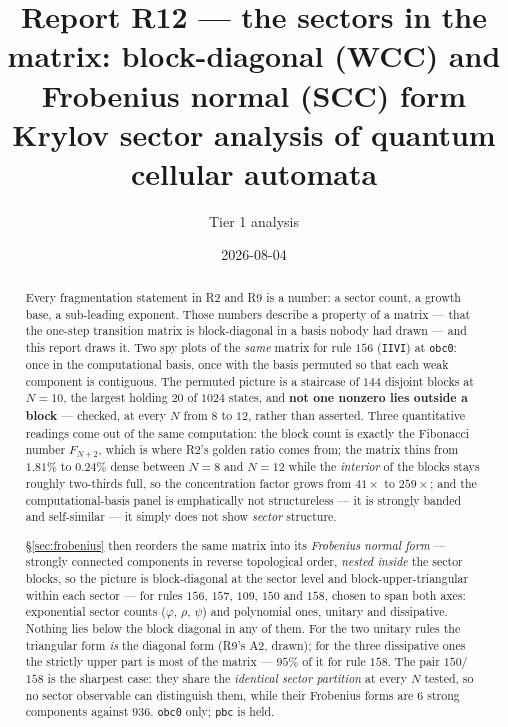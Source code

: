 \documentclass[11pt]{article}
\title{\textbf{Report R12 --- the sectors in the matrix: block-diagonal (WCC)
and Frobenius normal (SCC) form}\\
\large Krylov sector analysis of quantum cellular automata}
\author{Tier 1 analysis}
\date{2026-08-04}
\newcommand{\rt}[1]{\texttt{#1}}
\theoremstyle{plain}
\theoremstyle{definition}
\begin{document}
\maketitle

\begin{abstract}
Every fragmentation statement in R2 and R9 is a number: a sector count, a growth
base, a sub-leading exponent. Those numbers describe a property of a matrix ---
that the one-step transition matrix is block-diagonal in a basis nobody had drawn
--- and this report draws it. Two spy plots of the \emph{same} matrix for rule
$156$ (\rt{IIVI}) at \rt{obc0}: once in the computational basis, once with the
basis permuted so that each weak component is contiguous. The permuted picture is
a staircase of $144$ disjoint blocks at $N=10$, the largest holding $20$ of
$1024$ states, and \textbf{not one nonzero lies outside a block} --- checked, at
every $N$ from $8$ to $12$, rather than asserted. Three quantitative readings
come out of the same computation: the block count is exactly the Fibonacci number
$F_{N+2}$, which is where R2's golden ratio comes from; the matrix thins from
$1.81\%$ to $0.24\%$ dense between $N=8$ and $N=12$ while the \emph{interior} of
the blocks stays roughly two-thirds full, so the concentration factor grows from
$41\times$ to $259\times$; and the computational-basis panel is emphatically not
structureless --- it is strongly banded and self-similar --- it simply does not
show \emph{sector} structure.

\S\ref{sec:frobenius} then reorders the same matrix into its \emph{Frobenius
normal form} --- strongly connected components in reverse topological order,
\emph{nested inside} the sector blocks, so the picture is block-diagonal at the
sector level and block-upper-triangular within each sector --- for rules $156$,
$157$, $109$, $150$ and $158$, chosen to span both axes:
exponential sector counts ($\varphi$, $\rho$, $\psi$) and polynomial ones,
unitary and dissipative. Nothing lies below the block diagonal in any of them.
For the two unitary rules the triangular form \emph{is} the diagonal form
(R9's A2, drawn); for the three dissipative ones the strictly upper part is most
of the matrix --- $95\%$ of it for rule $158$. The pair $150$/$158$ is the
sharpest case: they share the \emph{identical sector partition} at every $N$
tested, so no sector observable can distinguish them, while their Frobenius
forms are $6$ strong components against $936$. \rt{obc0} only; \rt{pbc} is
held.
\end{abstract}
\end{document}

